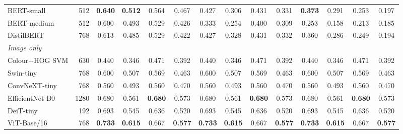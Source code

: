 \begin{table}[t]
\begin{tabular}{lrcccccccccccc}
BERT-small & 512 & \textbf{0.640} & \textbf{0.512} & 0.564 & 0.467 & 0.427 & 0.306 & 0.431 & 0.331 & \textbf{0.373} & 0.291 & 0.253 & 0.197\\
BERT-medium & 512 & 0.600 & 0.493 & 0.529 & 0.426 & 0.333 & 0.254 & 0.400 & 0.309 & 0.253 & 0.158 & 0.213 & 0.185\\
DistilBERT & 768 & 0.613 & 0.485 & 0.529 & 0.422 & 0.427 & 0.328 & 0.431 & 0.332 & 0.360 & 0.286 & 0.249 & 0.194\\
\midrule
\multicolumn{14}{l}{\emph{Image only}}\\
Colour$+$HOG SVM & 630 & 0.440 & 0.346 & 0.471 & 0.392 & 0.440 & 0.346 & 0.471 & 0.392 & 0.440 & 0.346 & 0.471 & 0.392\\
Swin-tiny & 768 & 0.600 & 0.507 & 0.569 & 0.463 & 0.600 & 0.507 & 0.569 & 0.463 & 0.600 & 0.507 & 0.569 & 0.463\\
ConvNeXT-tiny & 768 & 0.560 & 0.493 & 0.560 & 0.470 & 0.560 & 0.493 & 0.560 & 0.470 & 0.560 & 0.493 & 0.560 & 0.470\\
EfficientNet-B0 & 1280 & 0.680 & 0.561 & \textbf{0.680} & 0.573 & 0.680 & 0.561 & \textbf{0.680} & 0.573 & 0.680 & 0.561 & \textbf{0.680} & 0.573\\
DeiT-tiny & 192 & 0.693 & 0.545 & 0.636 & 0.520 & 0.693 & 0.545 & 0.636 & 0.520 & 0.693 & 0.545 & 0.636 & 0.520\\
ViT-Base/16 & 768 & \textbf{0.733} & \textbf{0.615} & 0.667 & \textbf{0.577} & \textbf{0.733} & \textbf{0.615} & 0.667 & \textbf{0.577} & \textbf{0.733} & \textbf{0.615} & 0.667 & \textbf{0.577}\\
\bottomrule
\end{tabular}
\end{table}

